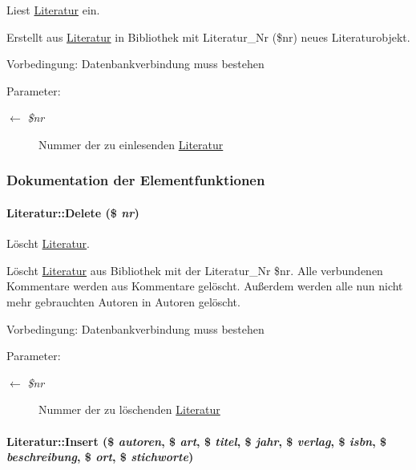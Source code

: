 Liest \hyperlink{classLiteratur}{Literatur} ein. 

Erstellt aus \hyperlink{classLiteratur}{Literatur} in Bibliothek mit Literatur\_\-Nr (\$nr) neues Literaturobjekt. \begin{Desc}
\item[Vorbedingung:]Datenbankverbindung muss bestehen \end{Desc}
\begin{Desc}
\item[Parameter:]
\begin{description}
\item[\mbox{$\leftarrow$} {\em \$nr}]Nummer der zu einlesenden \hyperlink{classLiteratur}{Literatur} \end{description}
\end{Desc}


\subsubsection{Dokumentation der Elementfunktionen}
\hypertarget{classLiteratur_f5b265d349df2a9d17079b81d808fa89}{
\paragraph[Delete]{\setlength{\rightskip}{0pt plus 5cm}Literatur::Delete (\$ {\em nr})}\hfill}
\label{classLiteratur_f5b265d349df2a9d17079b81d808fa89}


Löscht \hyperlink{classLiteratur}{Literatur}. 

Löscht \hyperlink{classLiteratur}{Literatur} aus Bibliothek mit der Literatur\_\-Nr \$nr. Alle verbundenen Kommentare werden aus Kommentare gelöscht. Außerdem werden alle nun nicht mehr gebrauchten Autoren in Autoren gelöscht. \begin{Desc}
\item[Vorbedingung:]Datenbankverbindung muss bestehen \end{Desc}
\begin{Desc}
\item[Parameter:]
\begin{description}
\item[\mbox{$\leftarrow$} {\em \$nr}]Nummer der zu löschenden \hyperlink{classLiteratur}{Literatur} \end{description}
\end{Desc}
\hypertarget{classLiteratur_3347551316e8f73659fc6f32ac6095df}{
\paragraph[Insert]{\setlength{\rightskip}{0pt plus 5cm}Literatur::Insert (\$ {\em autoren}, \$ {\em art}, \$ {\em titel}, \$ {\em jahr}, \$ {\em verlag}, \$ {\em isbn}, \$ {\em beschreibung}, \$ {\em ort}, \$ {\em stichworte})}\hfill}
\label{classLiteratur_3347551316e8f73659fc6f32ac6095df}


